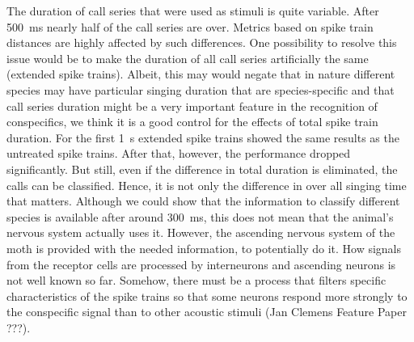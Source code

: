 \documentclass[12pt,a4paper,pdftex]{article}
\begin{document}
The duration of call series that were used as stimuli is quite variable. After 500~ms nearly half of the call series are over. Metrics based on spike train distances are highly affected by such differences. One possibility to resolve this issue would be to make the duration of all call series artificially the same (extended spike trains). Albeit, this may would negate that in nature different species may have particular singing duration that are species-specific and that call series duration might be a very important feature in the recognition of conspecifics, we think it is a good control for the effects of total spike train duration. 
For the first 1~s extended spike trains showed the same results as the untreated spike trains. After that, however, the performance dropped significantly. But still, even if the difference in total duration is eliminated, the calls can be classified. Hence, it is not only the difference in over all singing time that matters. 
Although we could show that the information to classify different species is available after around 300~ms, this does not mean that the animal's nervous system actually uses it. However, the ascending nervous system of the moth is provided with the needed information, to potentially do it. How signals from the receptor cells are processed by interneurons and ascending neurons is not well known so far. Somehow, there must be a process that filters specific characteristics of the spike trains so that some neurons respond more strongly to the conspecific signal than to other acoustic stimuli (Jan Clemens Feature Paper ???).
\end{document}
